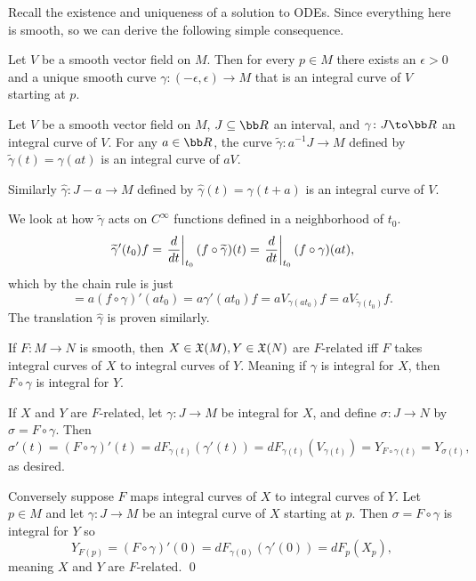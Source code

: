 Recall the existence and uniqueness of a solution to ODEs.
Since everything here is smooth, so we can derive the following simple consequence.

\bprop

    Let $V$ be a smooth vector field on $M$.
    Then for every $p\in M$ there exists an $\epsilon>0$ and a unique smooth curve $\gamma\colon(-\epsilon,\epsilon)\to M$ that is an integral
    curve of $V$ starting at $p$.

\eprop

\blemm

    Let $V$ be a smooth vector field on $M$, $J\subseteq\bR$ an interval, and $\gamma\colon J\to\bR$ an integral curve of $V$.
    For any $a\in\bR$, the curve $\tilde\gamma\colon a^{-1}J\to M$ defined by $\tilde\gamma(t)=\gamma(at)$ is an integral curve of $aV$.

    Similarly $\hat\gamma\colon J-a\to M$ defined by $\hat\gamma(t)=\gamma(t+a)$ is an integral curve of $V$.

\elemm

\bproof

    We look at how $\tilde\gamma$ acts on $C^\infty$ functions defined in a neighborhood of $t_0$.
    $$ \widetilde\gamma'(t_0)f = \left.{{d}\over{dt}}\right|_{t_0}(f\circ\widetilde\gamma)(t) = \left.{{d}\over{dt}}\right|_{t_0}(f\circ\gamma)(at) , $$
    which by the chain rule is just
    $$ = a(f\circ\gamma)'(at_0) = a\gamma'(at_0)f = aV_{\gamma(at_0)}f = aV_{\tilde\gamma(t_0)}f . $$
    The translation $\hat\gamma$ is proven similarly.

\eproof

\bprop

    If $F\colon M\to N$ is smooth, then $X\in{\frak X}(M),Y\in{\frak X}(N)$ are $F$-related iff $F$ takes integral curves of $X$ to integral curves of $Y$.
    Meaning if $\gamma$ is integral for $X$, then $F\circ\gamma$ is integral for $Y$.

\eprop

\bproof

    If $X$ and $Y$ are $F$-related, let $\gamma\colon J\to M$ be integral for $X$, and define $\sigma\colon J\to N$ by $\sigma=F\circ\gamma$.
    Then
    $$ \sigma'(t) = (F\circ\gamma)'(t) = dF_{\gamma(t)}(\gamma'(t)) = dF_{\gamma(t)}(V_{\gamma(t)}) = Y_{F\circ\gamma(t)} = Y_{\sigma(t)}, $$
    as desired.

    Conversely suppose $F$ maps integral curves of $X$ to integral curves of $Y$.
    Let $p\in M$ and let $\gamma\colon J\to M$ be an integral curve of $X$ starting at $p$.
    Then $\sigma=F\circ\gamma$ is integral for $Y$ so
    $$ Y_{F(p)} = (F\circ\gamma)'(0) = dF_{\gamma(0)}(\gamma'(0)) = dF_p(X_p), $$
    meaning $X$ and $Y$ are $F$-related.
    \qed

